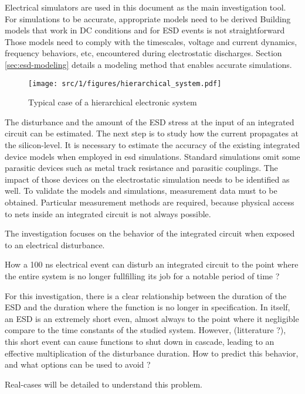 Electrical simulators are used in this document as the main investigation tool.
For simulations to be accurate, appropriate models need to be derived
Building models that work in DC conditions and for ESD events is not straightforward
Those models need to comply with the timescales, voltage and current dynamics, frequency behaviors, etc, encountered during electrostatic discharges.
Section \ref{sec:esd-modeling} details a modeling method that enables accurate simulations.

\begin{figure}[!h]
  \centering
  \texttt{[image: src/1/figures/hierarchical\_system.pdf]}
  \caption{Typical case of a hierarchical electronic system}
  \label{fig:ex-electronic-system}
\end{figure}

The disturbance and the amount of the ESD stress at the input of an integrated circuit can be estimated.
The next step is to study how the current propagates at the silicon-level.
It is necessary to estimate the accuracy of the existing integrated device models when employed in \gls{esd} simulations.
Standard simulations omit some parasitic devices such as metal track resistance and parasitic couplings.
The impact of those devices on the electrostatic simulation needs to be identified as well.
To validate the models and simulations, measurement data must to be obtained.
Particular measurement methods are required, because physical access to nets inside an integrated circuit is not always possible.

The investigation focuses on the behavior of the integrated circuit when exposed to an electrical disturbance.

How a 100 ns electrical event can disturb an integrated circuit to the point where the entire system is no longer fullfilling its job for a notable period of time ?

For this investigation, there is a clear relationship between the duration of the ESD and the duration where the function is no longer in specification.
In itself, an ESD is an extremely short even, almost always to the point where it negligible compare to the time constants of the studied system.
However, (litterature ?), this short event can cause functions to shut down in cascade, leading to an effective multiplication of the disturbance duration.
How to predict this behavior, and what options can be used to avoid ?

Real-cases will be detailed to understand this problem.
